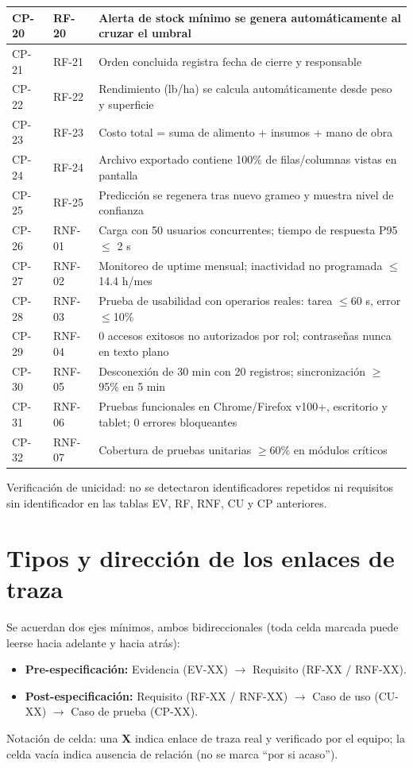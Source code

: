 \documentclass[11pt,a4paper]{article}
\begin{document}
\begin{longtable}{|p{2cm}|p{2cm}|p{10.5cm}|}
CP-20 & RF-20 & Alerta de stock mínimo se genera automáticamente al cruzar el umbral \\ \hline
CP-21 & RF-21 & Orden concluida registra fecha de cierre y responsable \\ \hline
CP-22 & RF-22 & Rendimiento (lb/ha) se calcula automáticamente desde peso y superficie \\ \hline
CP-23 & RF-23 & Costo total = suma de alimento + insumos + mano de obra \\ \hline
CP-24 & RF-24 & Archivo exportado contiene 100\% de filas/columnas vistas en pantalla \\ \hline
CP-25 & RF-25 & Predicción se regenera tras nuevo grameo y muestra nivel de confianza \\ \hline
CP-26 & RNF-01 & Carga con 50 usuarios concurrentes; tiempo de respuesta P95 $\leq$ 2 s \\ \hline
CP-27 & RNF-02 & Monitoreo de uptime mensual; inactividad no programada $\leq$ 14.4 h/mes \\ \hline
CP-28 & RNF-03 & Prueba de usabilidad con operarios reales: tarea $\leq$60 s, error $\leq$10\% \\ \hline
CP-29 & RNF-04 & 0 accesos exitosos no autorizados por rol; contraseñas nunca en texto plano \\ \hline
CP-30 & RNF-05 & Desconexión de 30 min con 20 registros; sincronización $\geq$95\% en 5 min \\ \hline
CP-31 & RNF-06 & Pruebas funcionales en Chrome/Firefox v100+, escritorio y tablet; 0 errores bloqueantes \\ \hline
CP-32 & RNF-07 & Cobertura de pruebas unitarias $\geq$60\% en módulos críticos \\ \hline
\end{longtable}

Verificación de unicidad: no se detectaron identificadores repetidos ni requisitos sin identificador en las tablas EV, RF, RNF, CU y CP anteriores.

\section{Tipos y dirección de los enlaces de traza}
Se acuerdan dos ejes mínimos, ambos bidireccionales (toda celda marcada puede leerse hacia adelante y hacia atrás):
\begin{itemize}
\item \textbf{Pre-especificación:} Evidencia (EV-XX) $\rightarrow$ Requisito (RF-XX / RNF-XX).
\item \textbf{Post-especificación:} Requisito (RF-XX / RNF-XX) $\rightarrow$ Caso de uso (CU-XX) $\rightarrow$ Caso de prueba (CP-XX).
\end{itemize}
Notación de celda: una \textbf{X} indica enlace de traza real y verificado por el equipo; la celda vacía indica ausencia de relación (no se marca ``por si acaso'').
\end{document}
